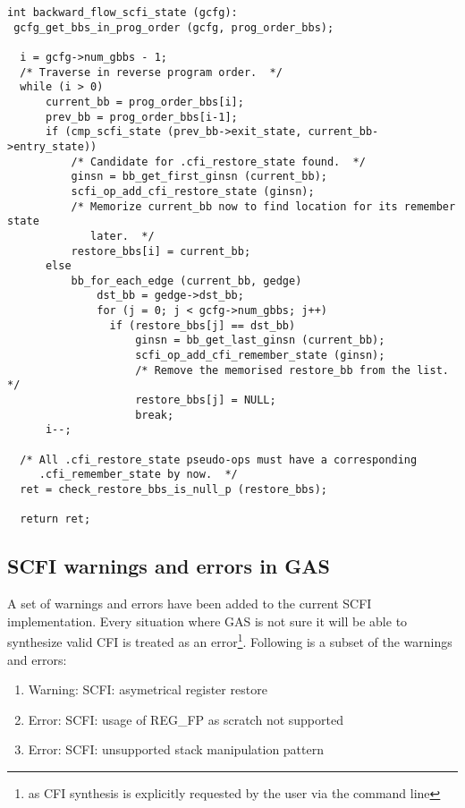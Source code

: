 \documentclass{article} \usepackage[a4paper, total={6in, 8in}]{geometry}
\begin{document}
\begin{verbatim}
int backward_flow_scfi_state (gcfg):
 gcfg_get_bbs_in_prog_order (gcfg, prog_order_bbs);

  i = gcfg->num_gbbs - 1;
  /* Traverse in reverse program order.  */
  while (i > 0)
      current_bb = prog_order_bbs[i];
      prev_bb = prog_order_bbs[i-1];
      if (cmp_scfi_state (prev_bb->exit_state, current_bb->entry_state))
          /* Candidate for .cfi_restore_state found.  */
          ginsn = bb_get_first_ginsn (current_bb);
          scfi_op_add_cfi_restore_state (ginsn);
          /* Memorize current_bb now to find location for its remember state
             later.  */
          restore_bbs[i] = current_bb;
      else
          bb_for_each_edge (current_bb, gedge)
              dst_bb = gedge->dst_bb;
              for (j = 0; j < gcfg->num_gbbs; j++)
                if (restore_bbs[j] == dst_bb)
                    ginsn = bb_get_last_ginsn (current_bb);
                    scfi_op_add_cfi_remember_state (ginsn);
                    /* Remove the memorised restore_bb from the list.  */
                    restore_bbs[j] = NULL;
                    break;
      i--;

  /* All .cfi_restore_state pseudo-ops must have a corresponding
     .cfi_remember_state by now.  */
  ret = check_restore_bbs_is_null_p (restore_bbs);

  return ret;
\end{verbatim}

\subsection{SCFI warnings and errors in GAS}
\label{scfidiagnostics}
A set of warnings and errors have been added to the current SCFI
implementation.  Every situation where GAS is not sure it will be able to
synthesize valid CFI is treated as an error\footnote{as CFI synthesis is
explicitly requested by the user via the command line}.  Following is a
subset of the warnings and errors:

\begin{enumerate}
\item Warning: SCFI: asymetrical register restore
\item Error: SCFI: usage of REG\_FP as scratch not supported
\item Error: SCFI: unsupported stack manipulation pattern
\end{enumerate}
\end{document}
